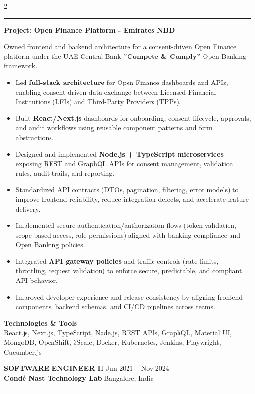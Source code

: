 \documentclass[10pt,a4paper]{article}
\newcommand{\blockdivider}{\vspace{0pt}\color{rulecolor}\rule{\linewidth}{0.5pt}\color{primary}\vspace{4pt}}
\newcommand{\roleheader}[4]{%
  \noindent
  \textbf{\MakeUppercase{#3}}%
  \hfill
  \textcolor{secondary}{#4}\\[0pt]

  \noindent
  \textbf{#1}%
  \hfill
  \textcolor{secondary}{#2}\\[0pt]
}
\newcommand{\roledivider}{%
  \vspace{-1pt}%
  {\color{rulecolor}\rule{\linewidth}{0.5pt}}%
  \vspace{2pt}%
}
\newcommand{\projecttitle}[1]{\textbf{#1}\par\vspace{2pt}}
\begin{document}
\begin{paracol}{2}
\blockdivider

\projecttitle{Project: Open Finance Platform - Emirates NBD}
Owned frontend and backend architecture for a consent-driven Open Finance platform under the UAE Central Bank \textbf{``Compete \& Comply''} Open Banking framework.

\begin{itemize}
  \item Led \textbf{full-stack architecture} for Open Finance dashboards and APIs, enabling consent-driven data exchange between Licensed Financial Institutions (LFIs) and Third-Party Providers (TPPs).
  \item Built \textbf{React/Next.js} dashboards for onboarding, consent lifecycle, approvals, and audit workflows using reusable component patterns and form abstractions.
  \item Designed and implemented \textbf{Node.js + TypeScript microservices} exposing REST and GraphQL APIs for consent management, validation rules, audit trails, and reporting.
  \item Standardized API contracts (DTOs, pagination, filtering, error models) to improve frontend reliability, reduce integration defects, and accelerate feature delivery.
  \item Implemented secure authentication/authorization flows (token validation, scope-based access, role permissions) aligned with banking compliance and Open Banking policies.
  \item Integrated \textbf{API gateway policies} and traffic controls (rate limits, throttling, request validation) to enforce secure, predictable, and compliant API behavior.
  \item Improved developer experience and release consistency by aligning frontend components, backend schemas, and CI/CD pipelines across teams.
\end{itemize}

\textbf{Technologies \& Tools}\\
React.js, Next.js, TypeScript, Node.js, REST APIs, GraphQL, Material UI, MongoDB, OpenShift, 3Scale, Docker, Kubernetes, Jenkins, Playwright, Cucumber.js
\vspace{16pt}

\roleheader{Cond\'e Nast Technology Lab}{Bangalore, India}{Software Engineer II}{Jun 2021 -- Nov 2024}
\roledivider


\end{paracol}
\end{document}
